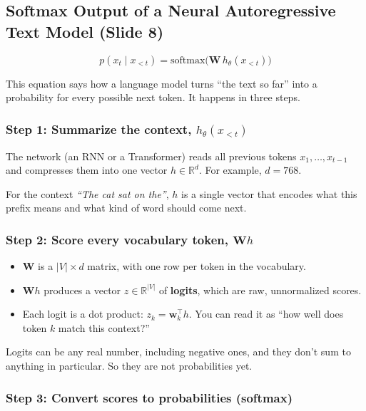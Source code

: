 
\subsection*{Softmax Output of a Neural Autoregressive Text Model (Slide 8)}

$$p(x_t \mid x_{<t}) = \mathrm{softmax}\big(\mathbf{W}\, h_\theta(x_{<t})\big)$$

This equation says how a language model turns ``the text so far'' into a probability for every possible next token. It happens in three steps.

\subsubsection*{Step 1: Summarize the context, $h_\theta(x_{<t})$}

The network (an RNN or a Transformer) reads all previous tokens $x_1, \dots, x_{t-1}$ and compresses them into one vector $h \in \mathbb{R}^d$. For example, $d = 768$.

For the context \textit{``The cat sat on the''}, $h$ is a single vector that encodes what this prefix means and what kind of word should come next.

\subsubsection*{Step 2: Score every vocabulary token, $\mathbf{W} h$}

\begin{itemize}
  \item $\mathbf{W}$ is a $|V| \times d$ matrix, with one row per token in the vocabulary.
  \item $\mathbf{W}h$ produces a vector $z \in \mathbb{R}^{|V|}$ of \textbf{logits}, which are raw, unnormalized scores.
  \item Each logit is a dot product: $z_k = \mathbf{w}_k^\top h$. You can read it as ``how well does token $k$ match this context?''
\end{itemize}

Logits can be any real number, including negative ones, and they don't sum to anything in particular. So they are not probabilities yet.

\subsubsection*{Step 3: Convert scores to probabilities (softmax)}

